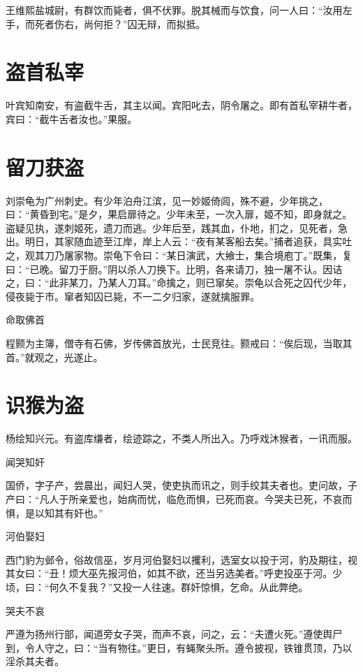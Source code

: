 \documentclass[a4paper,12pt,UTF8,twoside]{ctexbook}
\begin{document}
    王维熙盐城尉，有群饮而毙者，俱不伏罪。脱其械而与饮食，问一人曰：“汝用左手，而死者伤右，尚何拒？”囚无辩，而拟抵。
    
    \section{盗首私宰}
    
    叶宾知南安，有盗截牛舌，其主以闻。宾阳叱去，阴令屠之。即有首私宰耕牛者，宾曰：“截牛舌者汝也。”果服。
    
    \section{留刀获盗}
    
    刘崇龟为广州刺史。有少年泊舟江滨，见一妙姬倚闾，殊不避，少年挑之，曰：“黄昏到宅。”是夕，果启扉待之。少年未至，一次入扉，姬不知，即身就之。盗疑见执，遂刺姬死，遗刀而逃。少年后至，践其血，仆地，扪之，见死者，急出。明日，其家随血迹至江岸，岸上人云：“夜有某客船去矣。”捕者追获，具实吐之，观其刀乃屠家物。崇龟下令曰：“某日演武，大飨士，集合境庖丁。”既集，复曰：“已晚。留刀于厨。”阴以杀人刀换下。比明，各来请刀，独一屠不认。因诘之，曰：“此非某刀，乃某人刀耳。”命擒之，则已窜矣。崇龟以合死之囚代少年，侵夜毙于市。窜者知囚已毙，不一二夕归家，遂就擒服罪。
    
    命取佛首
    
    程颢为主簿，僧寺有石佛，岁传佛首放光，士民竞往。颢戒曰：“俟后现，当取其首。”就观之，光遂止。
    
    \section{识猴为盗}
    
    杨绘知兴元。有盗库缣者，绘迹踪之，不类人所出入。乃呼戏沐猴者，一讯而服。
    
    闻哭知奸
    
    国侨，字子产，尝晨出，闻妇人哭，使吏执而讯之，则手绞其夫者也。吏问故，子产曰：“凡人于所亲爱也，始病而忧，临危而惧，已死而哀。今哭夫已死，不哀而惧，是以知其有奸也。”
    
    河伯娶妇
    
    西门豹为邺令，俗故信巫，岁月河伯娶妇以攫利，选室女以投于河，豹及期往，视其女曰：“丑！烦大巫先报河伯，如其不欲，还当另选美者。”呼吏投巫于河。少顷，曰：“何久不复我？”又投一人往速。群奸惊惧，乞命。从此弊绝。
    
    哭夫不哀
    
    严遵为扬州行部，闻道旁女子哭，而声不哀，问之，云：“夫遭火死。”遵使舆尸到，令人守之，曰：“当有物往。”更日，有蝇聚头所。遵令披视，铁锥贯顶，乃以淫杀其夫者。
    
\end{document}
